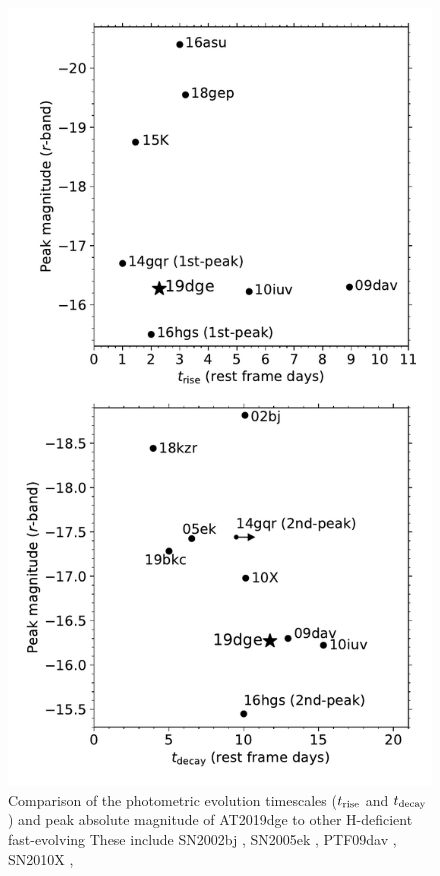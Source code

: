 \documentclass[twocolumn]{aastex63}
\begin{document}
\begin{CJK*}{UTF8}{gbsn}
\begin{figure}[htbp!]
	\centering
	\includegraphics[width=\columnwidth]{figures/compare_mag.pdf}
	\caption{Comparison of the photometric evolution timescales ($t_{\rm rise}$ and $t_{\rm  
			decay}$) and peak absolute magnitude of AT2019dge to other H-deficient fast-evolving 
		These include 
		SN2002bj \citep{Poznanski2010},
		SN2005ek \citep{Drout2013},  
		PTF09dav \citep{Sullivan2011},
		SN2010X \citep{Kasliwal2010},
}
\end{figure}
\end{CJK*}
\end{document}
